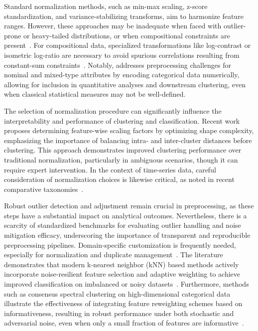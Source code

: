 \documentclass[sigconf]{acmart}
\begin{document}
Standard normalization methods, such as min-max scaling, z-score standardization, and variance-stabilizing transforms, aim to harmonize feature ranges. However, these approaches may be inadequate when faced with outlier-prone or heavy-tailed distributions, or when compositional constraints are present~\cite{ref60,ref65,ref66,ref67}. For compositional data, specialized transformations like log-contrast or isometric log-ratio are necessary to avoid spurious correlations resulting from constant-sum constraints~\cite{ref92,ref95}. Notably, \cite{ref66} addresses preprocessing challenges for nominal and mixed-type attributes by encoding categorical data numerically, allowing for inclusion in quantitative analyses and downstream clustering, even when classical statistical measures may not be well-defined.

The selection of normalization procedure can significantly influence the interpretability and performance of clustering and classification. Recent work~\cite{ref65} proposes determining feature-wise scaling factors by optimizing shape complexity, emphasizing the importance of balancing intra- and inter-cluster distances before clustering. This approach demonstrates improved clustering performance over traditional normalization, particularly in ambiguous scenarios, though it can require expert intervention. In the context of time-series data, careful consideration of normalization choices is likewise critical, as noted in recent comparative taxonomies~\cite{ref67}.

Robust outlier detection and adjustment remain crucial in preprocessing, as these steps have a substantial impact on analytical outcomes. Nevertheless, there is a scarcity of standardized benchmarks for evaluating outlier handling and noise mitigation efficacy, underscoring the importance of transparent and reproducible preprocessing pipelines. Domain-specific customization is frequently needed, especially for normalization and duplicate management~\cite{ref73,ref74,ref76,ref77,ref78,ref92,ref95}. The literature demonstrates that modern k-nearest neighbor (kNN) based methods actively incorporate noise-resilient feature selection and adaptive weighting to achieve improved classification on imbalanced or noisy datasets~\cite{ref73,ref74}. Furthermore, methods such as consensus spectral clustering on high-dimensional categorical data illustrate the effectiveness of integrating feature reweighting schemes based on informativeness, resulting in robust performance under both stochastic and adversarial noise, even when only a small fraction of features are informative~\cite{ref116}.
\end{document}
